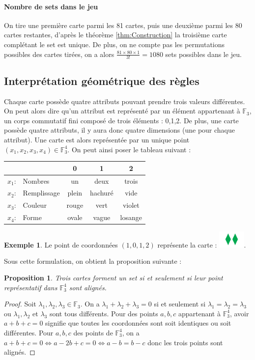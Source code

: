 \documentclass[a4paper,12pt,titlepage]{article}
\theoremstyle{plain}
\newtheorem{prop}{Proposition}
\theoremstyle{definition}
\newtheorem{ex}{Exemple}
\newcommand{\Ftrois}[1]{\mathbb{F}^#1_3}
\begin{document}
\paragraph{Nombre de sets dans le jeu} On tire une première carte parmi les 81 cartes, puis une deuxième parmi les 80 cartes restantes, d'après le théorème \ref{thm:Construction} la troisième carte complétant le set est unique. 
De plus, on ne compte pas les permutations possibles des cartes tirées, on a alors $\frac{81 \times 80 \times 1}{3!} = 1080$ sets possibles dans le jeu.

\subsection{Interprétation géométrique des règles}
Chaque carte possède quatre attributs pouvant prendre trois valeurs différentes. On peut alors dire qu'un attribut est représenté par un élément appartenant  à $\mathbb{F}_3$, un corps commutatif fini composé de trois éléments : 0,1,2.
De plus, une carte possède quatre attributs, il y aura donc quatre dimensions (une pour chaque attribut). Une carte est alors représentée par un unique point $(x_1,x_2,x_3,x_4) \in \Ftrois{4}$.
On peut ainsi poser le tableau suivant :

\begin{center}
\begin{tabular}{r l | c c c }
 & & 0 & 1 & 2 \\
\hline
$x_1$: & Nombres     & un		& deux	  & trois 	\\
$x_2$: & Remplissage & plein 	& hachuré & vide 	\\
$x_3$: & Couleur     & rouge	& vert	  & violet 	\\
$x_4$: & Forme       & ovale	& vague	  & losange \\
\end{tabular}
\end{center}

\begin{ex}
Le point de coordonnées $(1,0,1,2)$ représente la carte : \includegraphics[width=0.1\textwidth]{Img/1012.png}.
\end{ex}

\noindent Sous cette formulation, on obtient la proposition suivante :
\begin{prop}
Trois cartes forment un set si et seulement si leur point représentatif dans  $\Ftrois{4}$ sont alignés.
\end{prop}
\begin{proof}
Soit $\lambda_1,\lambda_2,\lambda_3 \in \mathbb{F}_3$. On a $\lambda_1 + \lambda_2 + \lambda_3 = 0$ si et seulement si $\lambda_1=\lambda_2=\lambda_3$ ou $\lambda_1,\lambda_2$ et $\lambda_3$ sont tous différents. Pour des points $a,b,c$ appartenant à  $\Ftrois{4}$, avoir $a+b+c=0$ signifie que toutes les coordonnées sont soit identiques ou soit différentes.
Pour $a,b,c$ des points de  $\Ftrois{4}$, on a $a+b+c=0 \iff a-2b+c=0 \iff a-b=b-c$ donc les trois points sont alignés.
\end{proof}
\end{document}
